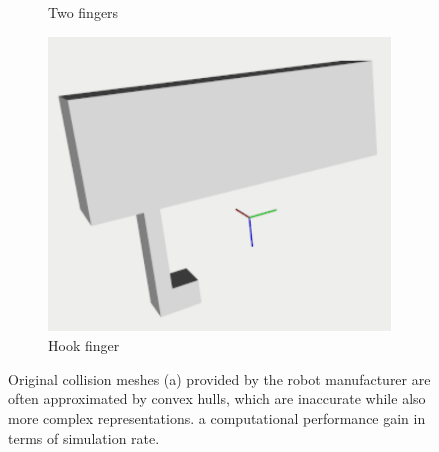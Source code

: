 \begin{figure}[t]
\begin{subfigure}{0.3\columnwidth}
    \caption{Two fingers}\label{fig:two_fingers}
\end{subfigure}%
\hfill
\begin{subfigure}{0.3\columnwidth}
    \includegraphics[width=\linewidth]{framework_manipulation/figures/hardware/single_hook_cropped.pdf}
    \caption{Hook finger}\label{fig:hook_finger}
\end{subfigure}

\caption{Original collision meshes (a) provided by the robot manufacturer are often approximated by convex hulls, which are inaccurate while also more complex representations.  a computational performance gain in terms of simulation rate.\label{fig:1}}

\end{figure}

